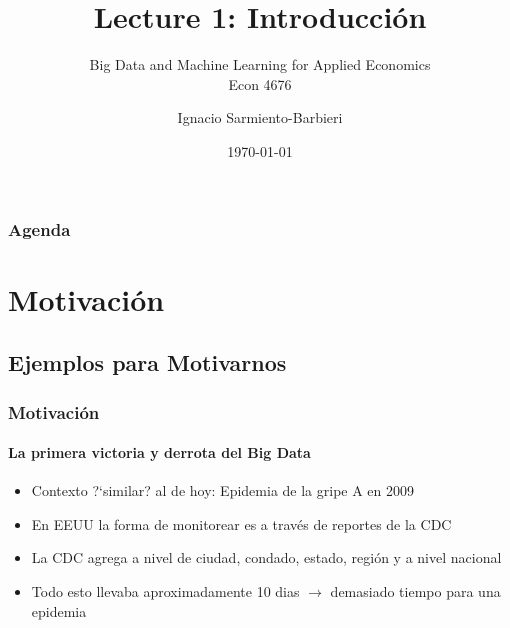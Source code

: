 \documentclass[
  shownotes,
  xcolor={svgnames},
  hyperref={colorlinks,citecolor=DarkBlue,linkcolor=DarkRed,urlcolor=DarkBlue}
  , aspectratio=169]{beamer}
\begin{document}
\title{Lecture 1: Introducción}
\subtitle{Big Data and Machine Learning for Applied Economics \\ Econ 4676}
\date{\today}

\author[Sarmiento-Barbieri]{Ignacio Sarmiento-Barbieri}


\begin{frame}[noframenumbering]
\maketitle
\end{frame}





\begin{frame}
\frametitle{Agenda}

\tableofcontents


\end{frame}


\section{Motivación}
\subsection{Ejemplos para Motivarnos}

\begin{frame}
\frametitle{Motivación}
\framesubtitle{La primera victoria y derrota del Big Data}

\begin{itemize}
  \item Contexto ?`similar? al de hoy: Epidemia de la gripe A en 2009
  \medskip
  \item En EEUU la forma de monitorear es a través de reportes de la CDC 
  \medskip
  \item La CDC agrega a nivel de ciudad, condado, estado, región y a nivel nacional
  \medskip
  \item Todo esto llevaba aproximadamente 10 dias $\rightarrow$ demasiado tiempo para una epidemia
\end{itemize}
\end{frame}
\end{document}
